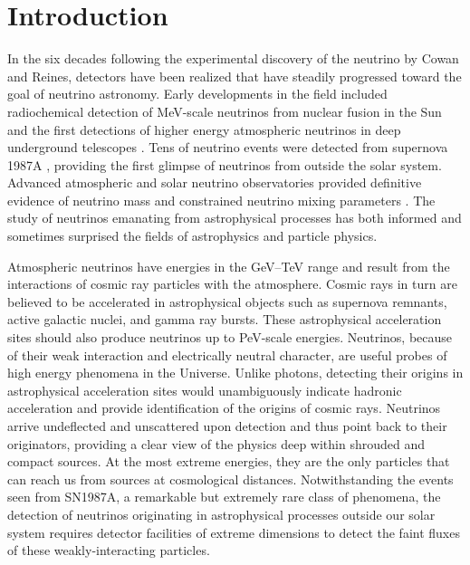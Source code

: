 
\section{Introduction}
\label{sec:intro}

In the six decades following the experimental
discovery of the neutrino by Cowan and Reines, detectors have been realized
that have steadily progressed toward the goal of neutrino
astronomy.  Early developments in the field included 
radiochemical detection of MeV-scale neutrinos from
nuclear fusion in the Sun \cite{Homestake} and the first detections of
higher energy
atmospheric neutrinos in deep underground telescopes
\cite{Achar,Witwatersrand}. Tens of neutrino
events were detected from supernova 1987A
\cite{SK1987A,IMB1987A,BUST1987A}, providing the first glimpse of neutrinos
from outside the solar system.  Advanced
atmospheric and solar neutrino observatories provided definitive
evidence of neutrino mass and constrained neutrino mixing
parameters \cite{SK,SNO}. The study of neutrinos emanating from astrophysical
processes has both informed and sometimes surprised the fields of
astrophysics and particle physics. 

Atmospheric neutrinos have energies in the GeV--TeV range and result from the interactions of cosmic ray
particles with the atmosphere. Cosmic rays in turn are
believed to be accelerated in astrophysical objects such as supernova
remnants, active galactic nuclei, and gamma ray bursts. These
astrophysical acceleration sites should also produce neutrinos up to 
PeV-scale energies. Neutrinos, because of their weak interaction and electrically neutral character, are useful probes of high
energy phenomena in the Universe. Unlike photons, detecting their origins in astrophysical
acceleration sites would unambiguously indicate hadronic acceleration and
provide identification of the origins of cosmic rays. Neutrinos arrive 
undeflected and unscattered upon detection and thus point back to their
originators, providing
a clear view of the physics deep within shrouded and compact sources. At
the most extreme energies, they are the only particles that can reach 
us from sources at cosmological distances. Notwithstanding the events seen from SN1987A, a remarkable but
extremely rare class of phenomena, the detection of neutrinos originating in
astrophysical processes outside our solar system requires detector facilities of
extreme dimensions to detect the faint fluxes of these weakly-interacting
particles. 

